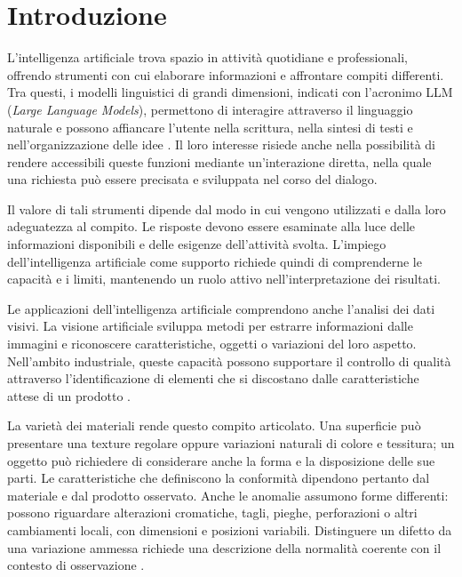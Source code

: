 \chapter*{Introduzione}

L'intelligenza artificiale trova spazio in attività quotidiane e professionali, offrendo strumenti con cui elaborare informazioni e affrontare compiti differenti. Tra questi, i modelli linguistici di grandi dimensioni, indicati con l'acronimo LLM (\textit{Large Language Models}), permettono di interagire attraverso il linguaggio naturale e possono affiancare l'utente nella scrittura, nella sintesi di testi e nell'organizzazione delle idee \cite{Korinek_2023}. Il loro interesse risiede anche nella possibilità di rendere accessibili queste funzioni mediante un'interazione diretta, nella quale una richiesta può essere precisata e sviluppata nel corso del dialogo.

Il valore di tali strumenti dipende dal modo in cui vengono utilizzati e dalla loro adeguatezza al compito. Le risposte devono essere esaminate alla luce delle informazioni disponibili e delle esigenze dell'attività svolta. L'impiego dell'intelligenza artificiale come supporto richiede quindi di comprenderne le capacità e i limiti, mantenendo un ruolo attivo nell'interpretazione dei risultati.

Le applicazioni dell'intelligenza artificiale comprendono anche l'analisi dei dati visivi. La visione artificiale sviluppa metodi per estrarre informazioni dalle immagini e riconoscere caratteristiche, oggetti o variazioni del loro aspetto. Nell'ambito industriale, queste capacità possono supportare il controllo di qualità attraverso l'identificazione di elementi che si discostano dalle caratteristiche attese di un prodotto \cite{Yang_et_al._2021,Cui_et_al._2023}.

La varietà dei materiali rende questo compito articolato. Una superficie può presentare una texture regolare oppure variazioni naturali di colore e tessitura; un oggetto può richiedere di considerare anche la forma e la disposizione delle sue parti. Le caratteristiche che definiscono la conformità dipendono pertanto dal materiale e dal prodotto osservato. Anche le anomalie assumono forme differenti: possono riguardare alterazioni cromatiche, tagli, pieghe, perforazioni o altri cambiamenti locali, con dimensioni e posizioni variabili. Distinguere un difetto da una variazione ammessa richiede una descrizione della normalità coerente con il contesto di osservazione \cite{Cui_et_al._2023}.


